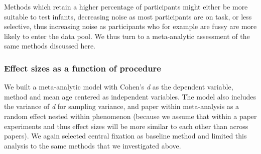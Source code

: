 \documentclass[english,floatsintext,man]{apa6}
\begin{document}
Methods which retain a higher percentage of participants might either be
more suitable to test infants, decreasing noise as most participants are
on task, or less selective, thus increasing noise as participants who
for example are fussy are more likely to enter the data pool. We thus
turn to a meta-analytic assessment of the same methods discussed here.

\subsubsection{Effect sizes as a function of
procedure}\label{effect-sizes-as-a-function-of-procedure}

We built a meta-analytic model with Cohen's \emph{d} as the dependent
variable, method and mean age centered as independent variables. The
model also includes the variance of \emph{d} for sampling variance, and
paper within meta-analysis as a random effect nested within phenomenon
(because we assume that within a paper experiments and thus effect sizes
will be more similar to each other than across papers). We again
selected central fixation as baseline method and limited this analysis
to the same methods that we investigated above.
\end{document}
